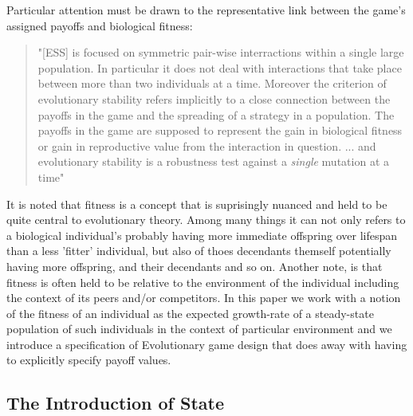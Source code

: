 \documentclass[journal,article,accept,oneauthors,pdftex,10pt,a4paper]{mdpi}
\begin{document}
Particular attention must be drawn to the representative link between the game's assigned payoffs and biological fitness:
\begin{quote}"[ESS] is focused on symmetric pair-wise interractions within a single large population. In particular it does not deal with interactions that take place between more than two individuals at a time. Moreover the criterion of evolutionary stability refers implicitly to a close connection between the payoffs in the game and the spreading of a strategy in a population. The payoffs in the game are supposed to represent the gain in biological fitness or gain in reproductive value from the interaction in question. ... and evolutionary stability is a robustness test against a \textit{single} mutation at a time"\cite{weibull}\end{quote}

It is noted that fitness is a concept that is suprisingly nuanced and held to be quite central to evolutionary theory.\cite{sep-fitness} Among many things it can not only refers to a biological individual's probably having more immediate offspring over lifespan than a less 'fitter' individual, but also of thoes decendants themself potentially having more offspring, and their decendants and so on. Another note, is that fitness is often held to be relative to the environment of the individual including the context of its peers and/or competitors.
In this paper we work with a notion of the fitness of an individual as the expected growth-rate of a steady-state population of such individuals in the context of particular environment and we introduce a specification of Evolutionary game design that does away with having to explicitly specify payoff values.

\subsection{The Introduction of State}
\end{document}
